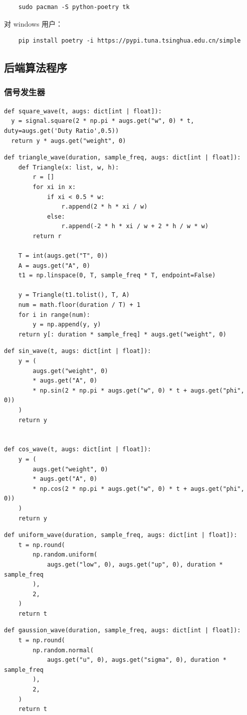 \documentclass[12pt]{ctexart}
\begin{document}
\begin{lstlisting}
    sudo pacman -S python-poetry tk 
\end{lstlisting}

对 windows 用户：

\begin{lstlisting}
    pip install poetry -i https://pypi.tuna.tsinghua.edu.cn/simple
\end{lstlisting}

\subsection{后端算法程序}

\subsubsection{信号发生器}
\begin{lstlisting}[title=方波信号发生器]
def square_wave(t, augs: dict[int | float]):
  y = signal.square(2 * np.pi * augs.get("w", 0) * t, duty=augs.get('Duty Ratio',0.5))
  return y * augs.get("weight", 0)
\end{lstlisting}
\begin{lstlisting}[title=三角波信号发生器]
def triangle_wave(duration, sample_freq, augs: dict[int | float]):
    def Triangle(x: list, w, h):
        r = []
        for xi in x:
            if xi < 0.5 * w:
                r.append(2 * h * xi / w)
            else:
                r.append(-2 * h * xi / w + 2 * h / w * w)
        return r

    T = int(augs.get("T", 0))
    A = augs.get("A", 0)
    t1 = np.linspace(0, T, sample_freq * T, endpoint=False)

    y = Triangle(t1.tolist(), T, A)
    num = math.floor(duration / T) + 1
    for i in range(num):
        y = np.append(y, y)
    return y[: duration * sample_freq] * augs.get("weight", 0)
\end{lstlisting}
\begin{lstlisting}[title=正余弦信号发生器]
  def sin_wave(t, augs: dict[int | float]):
    y = (
        augs.get("weight", 0)
        * augs.get("A", 0)
        * np.sin(2 * np.pi * augs.get("w", 0) * t + augs.get("phi", 0))
    )
    return y


def cos_wave(t, augs: dict[int | float]):
    y = (
        augs.get("weight", 0)
        * augs.get("A", 0)
        * np.cos(2 * np.pi * augs.get("w", 0) * t + augs.get("phi", 0))
    )
    return y
\end{lstlisting}
\begin{lstlisting}[title=均匀分布随机信号发生器]
def uniform_wave(duration, sample_freq, augs: dict[int | float]):
    t = np.round(
        np.random.uniform(
            augs.get("low", 0), augs.get("up", 0), duration * sample_freq
        ),
        2,
    )
    return t
\end{lstlisting}
\begin{lstlisting}[title=高斯分布随机信号发生器]
  def gaussion_wave(duration, sample_freq, augs: dict[int | float]):
    t = np.round(
        np.random.normal(
            augs.get("u", 0), augs.get("sigma", 0), duration * sample_freq
        ),
        2,
    )
    return t
\end{lstlisting}
\end{document}
